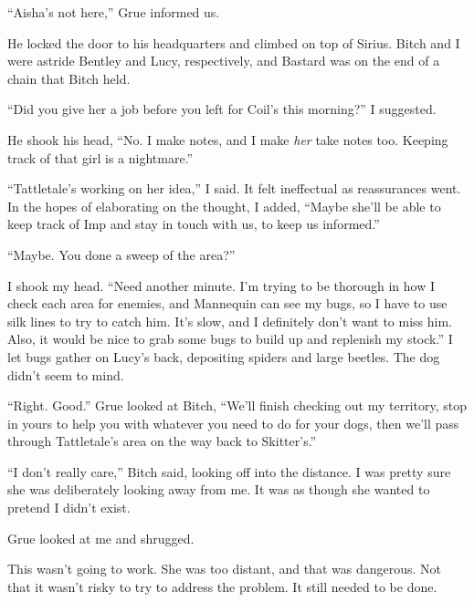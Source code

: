 





``Aisha's not here,'' Grue informed us.



He locked the door to his headquarters and climbed on top of Sirius.  Bitch and I were astride Bentley and Lucy, respectively, and Bastard was on the end of a chain that Bitch held.



``Did you give her a job before you left for Coil's this morning?'' I suggested.



He shook his head, ``No.  I make notes, and I make \emph{her} take notes too.  Keeping track of that girl is a nightmare.''



``Tattletale's working on her idea,'' I said.  It felt ineffectual as reassurances went.  In the hopes of elaborating on the thought, I added, ``Maybe she'll be able to keep track of Imp and stay in touch with us, to keep us informed.''



``Maybe.  You done a sweep of the area?''



I shook my head.  ``Need another minute.  I'm trying to be thorough in how I check each area for enemies, and Mannequin can see my bugs, so I have to use silk lines to try to catch him.  It's slow, and I definitely don't want to miss him.  Also, it would be nice to grab some bugs to build up and replenish my stock.''  I let bugs gather on Lucy's back, depositing spiders and large beetles.  The dog didn't seem to mind.



``Right.  Good.''  Grue looked at Bitch, ``We'll finish checking out my territory, stop in yours to help you with whatever you need to do for your dogs, then we'll pass through Tattletale's area on the way back to Skitter's.''



``I don't really care,'' Bitch said, looking off into the distance.  I was pretty sure she was deliberately looking away from me.  It was as though she wanted to pretend I didn't exist.



Grue looked at me and shrugged.



This wasn't going to work.  She was too distant, and that was dangerous.  Not that it wasn't risky to try to address the problem.  It still needed to be done.



